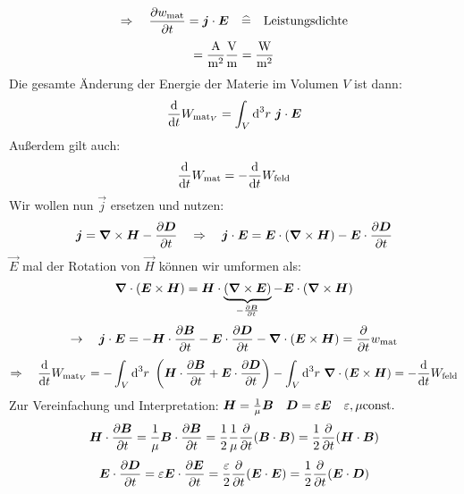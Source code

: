 \begin{equation*}
\Rightarrow \quad \frac{\partial w_{\textrm{mat}}}{\partial t} = \bm{j} \cdot \bm{E} \quad \widehat{=} \quad \textrm{Leistungsdichte}
\end{equation*}
\begin{equation*}
[\vec{j}] [\vec{E}] = \frac{\tx{A}}{\tx{m}^2} \frac{\tx{V}}{\tx{m}} = \frac{\tx{W}}{\tx{m}^2}
\end{equation*}
Die gesamte Änderung der Energie der Materie im Volumen $ V $ ist dann:
\begin{equation*}
\frac{\textrm{d} }{\textrm{d} t} W_{\textrm{mat}_V} = \int_V \textrm{d}^3 r \ \bm{j} \cdot \bm{E}
\end{equation*}
Außerdem gilt auch:
\begin{equation*}
\frac{\textrm{d} }{\textrm{d} t} W_{\textrm{mat}} = - \frac{\textrm{d} }{\textrm{d} t} W_{\textrm{feld}}
\end{equation*}
Wir wollen nun $ \vec{j} $ ersetzen und nutzen:
\begin{equation*}
\bm{j} = \bm{\nabla} \times \bm{H} - \frac{\partial \bm{D}}{\partial t} \quad \Rightarrow \quad \bm{j} \cdot \bm{E} = \bm{E} \cdot (\bm{\nabla} \times \bm{H}) - \bm{E} \cdot \frac{\partial \bm{D}}{\partial t}
\end{equation*}
$ \vec{E} $ mal der Rotation von $ \vec{H} $ können wir umformen als:
\begin{equation*}
\bm{\nabla} \cdot (\bm{E} \times \bm{H}) = \bm{H} \cdot \underbrace{(\bm{\nabla} \times \bm{E})}_{- \frac{\partial \bm{B}}{\partial t}} - \bm{E} \cdot (\bm{\nabla} \times \bm{H})
\end{equation*}
\begin{equation*}
\rightarrow \quad  \bm{j} \cdot \bm{E} = - \bm{H} \cdot \frac{\partial \bm{B}}{\partial t} - \bm{E} \cdot \frac{\partial \bm{D}}{\partial t} - \bm{\nabla} \cdot (\bm{E} \times \bm{H}) = \frac{\partial }{\partial t} w_{\textrm{mat}}
\end{equation*}
\begin{equation*}
\Rightarrow \quad \frac{\textrm{d} }{\textrm{d} t} W_{\textrm{mat}_V} = - \int_V \textrm{d}^3 r \ \left(\bm{H} \cdot \frac{\partial \bm{B}}{\partial t} + \bm{E} \cdot \frac{\partial \bm{D}}{\partial t} \right) - \int_V \textrm{d}^3 r \ \bm{\nabla} \cdot (\bm{E} \times \bm{H}) = - \frac{\textrm{d} }{\textrm{d} t} W_{\textrm{feld}}
\end{equation*}
Zur Vereinfachung und Interpretation: $ \bm{H} = \frac{1}{\mu} \bm{B} \quad \bm{D} = \varepsilon \bm{E} \quad \varepsilon, \mu \textrm{const.} $
\begin{equation*}
\bm{H} \cdot \frac{\partial \bm{B}}{\partial t} = \frac{1}{\mu} \bm{B} \cdot \frac{\partial \bm{B}}{\partial t} = \frac{1}{2} \frac{1}{\mu} \frac{\partial }{\partial t} (\bm{B} \cdot \bm{B}) = \frac{1}{2} \frac{\partial }{\partial t} (\bm{H} \cdot \bm{B})
\end{equation*}
\begin{equation*}
\bm{E} \cdot \frac{\partial \bm{D}}{\partial t} = \varepsilon \bm{E} \cdot \frac{\partial \bm{E}}{\partial t} = \frac{\varepsilon}{2} \frac{\partial }{\partial t} (\bm{E} \cdot \bm{E}) = \frac{1}{2} \frac{\partial }{\partial t} (\bm{E} \cdot \bm{D})
\end{equation*}

